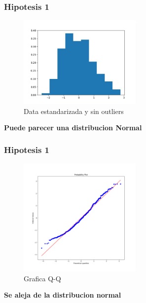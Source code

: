 \documentclass{beamer}
\begin{document}
\begin{frame}
\frametitle{Hipotesis 1}
\begin{figure}[t]
  \caption{Data estandarizada y sin outliers}
  \includegraphics[width=6cm]{data_sin_outliers.jpeg}
\end{figure}
  \textbf{Puede parecer una distribucion Normal}

\end{frame}

\begin{frame}
\frametitle{Hipotesis 1}
\begin{figure}[t]
  \caption{Grafica Q-Q}
  \includegraphics[width=6cm]{grafiaq-q.png}
\end{figure}

  \textbf{Se aleja de la distribucion normal}
\end{frame}
\end{document}
